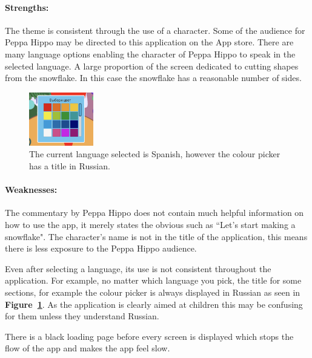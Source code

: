 \documentclass[11pt]{article}
\begin{document}
                \paragraph{Strengths:}
                The theme is consistent through the use of a character. Some of the audience for Peppa Hippo may be directed to this application on the App store. There are many language options enabling the character of Peppa Hippo to speak in the selected language. A large proportion of the screen dedicated to cutting shapes from the snowflake. In this case the snowflake has a reasonable number of sides. 

                \begin{figure}
                    \includegraphics[width=0.25\textwidth]{Images/peppa/peppaRussian}
                    \caption{The current language selected is Spanish, however the colour picker has a title in Russian.}
                    \label{fig:peppaRussian}
                \end{figure}
                \paragraph{Weaknesses:}
                The commentary by Peppa Hippo does not contain much helpful information on how to use the app, it merely states the obvious such as ``Let's start making a snowflake". The character's name is not in the title of the application, this means there is less exposure to the Peppa Hippo audience.
                
                Even after selecting a language, its use is not consistent throughout the application. For example, no matter which language you pick, the title for some sections, for example the colour picker is always displayed in Russian as seen in \textbf{Figure~\ref{fig:peppaRussian}}.  As the application is clearly aimed at children this may be confusing for them unless they understand Russian. 
                
                There is a black loading page before every screen is displayed which stops the flow of the app and makes the app feel slow.
\end{document}
